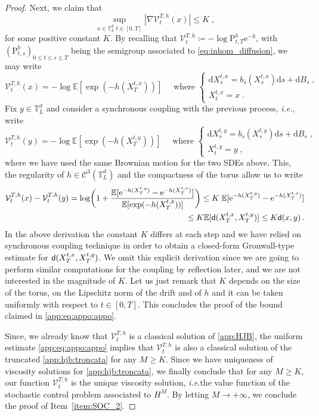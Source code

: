 \documentclass[final,12pt]{colt2023} %
\def\ie{\textit{i.e.}}
\newcommand{\bes}{\begin{equation}}
\newcommand{\ees}{\end{equation}}
\newcommand{\De}{\mathrm{d}}
\newcommand{\rmP}{\mathrm{P}}
\newcommand{\rme}{\mathrm{e}}
\newcommand{\sfd}{{\sf d}}
\def\ie{\textit{i.e.}}
\def\eqsp{\;}
\begin{document}
\begin{proof}
Next, we claim that
\begin{equation}\label{app:eq:appo:appo}
\sup_{x\in\mathbb{T}^d_L\eqsp
t\in[0,T]
}\left|\nabla \mathcal{V}^{T,h}_t(x)\right|\leq K\eqsp,
\end{equation}
for some positive constant $K$. By recalling that $\mathcal{V}_t^{T,h}\coloneqq -\log \rmP_{t,T}^b \rme^{-h}$, with $(\rmP^b_{t,s})_{0\leq t\leq s\leq T}$ being the semigroup associated to \eqref{eq:inhom_diffusion}, we may write
\bes
\mathcal{V}_t^{T,h}(x)=-\log \mathbb{E}[\exp(-h(X^{t,x}_T))]\quad\text{ where }\begin{cases}
\De X_s^{t,x}=b_s(X_s^{t,x})\De s+\De B_s\eqsp,\\
X_t^{t,x}=x\eqsp.
\end{cases}
\ees
Fix $y\in\mathbb{T}^d_L$ and consider a synchronous coupling with the previous process, \ie, write
\bes
\mathcal{V}_t^{T,h}(y)=-\log \mathbb{E}[\exp(-h(X^{t,y}_T))]\quad\text{ where }\begin{cases}
\De X_s^{t,y}=b_s(X_s^{t,y})\De s+\De B_s\eqsp,\\
X_t^{t,y}=y\eqsp,
\end{cases}
\ees
where we have used the same Brownian motion for the two SDEs above. This, the regularity of $h\in\mathcal{C}^3(\mathbb{T}^d_L)$ and the compactness of the torus allow us to write
\bes
\begin{split}
\mathcal{V}_t^{T,h}(x)-\mathcal{V}_t^{T,h}(y)=\log\biggl(1+\frac{\mathbb{E}[\rme^{-h(X^{t,y}_T)}-\rme^{-h(X^{t,x}_T)}]}{\mathbb{E}[\exp(-h(X^{t,x}_T))]}\biggr)\leq K\eqsp\mathbb{E}[\rme^{-h(X^{t,y}_T)}-\rme^{-h(X^{t,x}_T)}]\\
\leq K \mathbb{E}[\sfd(X^{t,x}_T,X^{t,y}_T)]\leq K\sfd(x,y)\,.
\end{split}
\ees
In the above derivation the constant $K$ differs at each step and we have relied on synchronous coupling technique in order to obtain a closed-form Gronwall-type estimate for $\sfd(X^{t,x}_T,X^{t,y}_T)$. We omit this explicit derivation since we are going to perform similar computations for the coupling by reflection later, and we are not interested in the magnitude of $K$. Let us just remark that $K$ depends on the size of the torus, on the Lipschitz norm of the drift and of $h$ and it can be taken uniformly with respect to $t\in[0,T]$.
This concludes the proof of the bound claimed in \eqref{app:eq:appo:appo}.

Since, we already know that $\mathcal{V}_t^{T,h}$ is a classical solution of \eqref{app:HJB}, the uniform estimate \eqref{app:eq:appo:appo} implies that $\mathcal{V}_t^{T,h}$ is also a classical solution of the truncated \eqref{app:hjb:troncata} for any $M\geq K$. Since we have uniqueness of viscosity solutions for \eqref{app:hjb:troncata}, we finally conclude that  
for any $M\geq K$, our function $\mathcal{V}_t^{T,h}$ is the unique viscosity solution, \ie the value function of the stochastic control problem associated to $H^M$. By letting $M\to+\infty$, we conclude the proof of Item~\ref{item:SOC_2}.


\end{proof}
\end{document}
